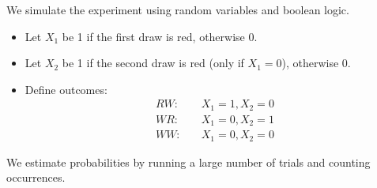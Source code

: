 \documentclass[journal]{IEEEtran}
\begin{document}
We simulate the experiment using random variables and boolean logic.  

\begin{itemize}
    \item Let $X_1$ be 1 if the first draw is red, otherwise 0.
    \item Let $X_2$ be 1 if the second draw is red (only if $X_1 = 0$), otherwise 0.
    \item Define outcomes:
    \begin{align*}
        RW: & \quad X_1 = 1, X_2 = 0 \\
        WR: & \quad X_1 = 0, X_2 = 1 \\
        WW: & \quad X_1 = 0, X_2 = 0
    \end{align*}
\end{itemize}
We estimate probabilities by running a large number of trials and counting occurrences.
\end{document}
